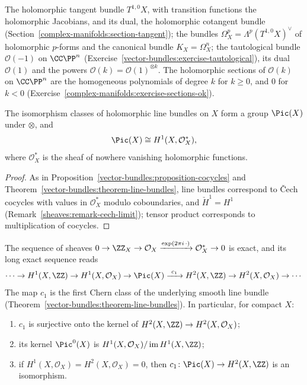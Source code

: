 \begin{example}\label{complex-manifolds:example-bundles}
The holomorphic tangent bundle $T^{1,0}X$, with transition functions the holomorphic Jacobians, and its dual, the holomorphic cotangent bundle
(Section~\ref{complex-manifolds:section-tangent}); the bundles $\Omega^p_X = \Lambda^p(T^{1,0}X)^\vee$ of holomorphic $p$-forms and the canonical bundle
$K_X = \Omega^n_X$; the tautological bundle $\mathcal{O}(-1)$ on $\CC\PP^n$ (Exercise~\ref{vector-bundles:exercise-tautological}), its dual $\mathcal{O}(1)$ and the powers
$\mathcal{O}(k) = \mathcal{O}(1)^{\otimes k}$. The holomorphic sections of $\mathcal{O}(k)$ on $\CC\PP^n$ are the homogeneous polynomials of degree $k$ for $k \geq 0$, and $0$ for $k < 0$
(Exercise~\ref{complex-manifolds:exercise-sections-ok}).
\end{example}

\begin{proposition}\label{complex-manifolds:proposition-picard}
The isomorphism classes of holomorphic line bundles on $X$ form a group $\Pic(X)$ under $\otimes$, and
\[
\Pic(X) \cong H^1(X, \mathcal{O}_X^*),
\]
where $\mathcal{O}_X^*$ is the sheaf of nowhere vanishing holomorphic functions.
\end{proposition}

\begin{proof}
As in Proposition~\ref{vector-bundles:proposition-cocycles} and Theorem~\ref{vector-bundles:theorem-line-bundles}, line bundles correspond to \v{C}ech cocycles with values in $\mathcal{O}_X^*$ modulo
coboundaries, and $\check{H}^1 = H^1$ (Remark~\ref{sheaves:remark-cech-limit}); tensor product corresponds to multiplication of cocycles.
\end{proof}

\begin{theorem}\label{complex-manifolds:theorem-exponential}
The sequence of sheaves $0 \to \ZZ_X \to \mathcal{O}_X \xrightarrow{\exp(2\pi i\,\cdot)} \mathcal{O}_X^* \to 0$ is exact, and its long exact sequence reads
\[
\cdots \to H^1(X, \ZZ) \to H^1(X, \mathcal{O}_X) \to \Pic(X) \xrightarrow{\ c_1\ } H^2(X, \ZZ) \to H^2(X, \mathcal{O}_X) \to \cdots
\]
The map $c_1$ is the first Chern class of the underlying smooth line bundle (Theorem~\ref{vector-bundles:theorem-line-bundles}). In particular, for compact $X$:
\begin{enumerate}
\item $c_1$ is surjective onto the kernel of $H^2(X, \ZZ) \to H^2(X, \mathcal{O}_X)$;
\item its kernel $\Pic^0(X)$ is $H^1(X, \mathcal{O}_X)/\operatorname{im}H^1(X, \ZZ)$;
\item if $H^1(X, \mathcal{O}_X) = H^2(X, \mathcal{O}_X) = 0$, then $c_1 \colon \Pic(X) \to H^2(X, \ZZ)$ is an isomorphism.
\end{enumerate}
\end{theorem}

